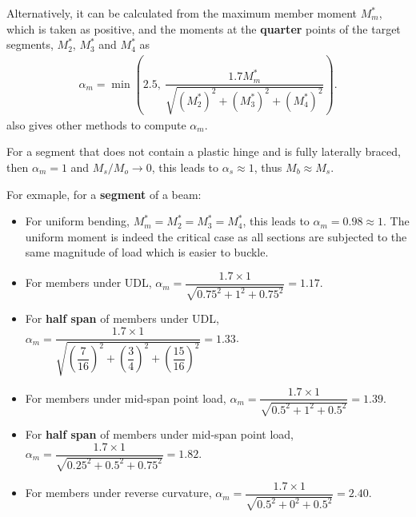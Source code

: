 Alternatively, it can be calculated from the maximum member moment $M^*_m$, which is taken as positive, and the moments at the \textbf{quarter} points of the target segments, $M^*_2$, $M^*_3$ and $M^*_4$ as
\begin{gather}
\alpha_m=\min\left(2.5,~\dfrac{1.7M^*_m}{\sqrt{\left(M^*_2\right)^2+\left(M^*_3\right)^2+\left(M^*_4\right)^2}}\right).
\end{gather}
 also gives other methods to compute $\alpha_m$.

For a segment that does not contain a plastic hinge and is fully laterally braced, then $\alpha_m=1$ and $M_s/M_o\rightarrow0$, this leads to $\alpha_s\approx1$, thus $M_b\approx{}M_s$.

For exmaple, for a \textbf{segment} of a beam:
\begin{itemize}
\item For uniform bending, $M^*_m=M^*_2=M^*_3=M^*_4$, this leads to $\alpha_m=0.98\approx1$. The uniform moment is indeed the critical case as all sections are subjected to the same magnitude of load which is easier to buckle.
\begin{figure}[H]
\centering
\end{figure}
\item For members under UDL, $\alpha_m=\dfrac{1.7\times1}{\sqrt{0.75^2+1^2+0.75^2}}=1.17$.
\begin{figure}[H]
\centering
\end{figure}
\item For \textbf{half span} of members under UDL, $\alpha_m=\dfrac{1.7\times1}{\sqrt{\left(\dfrac{7}{16}\right)^2+\left(\dfrac{3}{4}\right)^2+\left(\dfrac{15}{16}\right)^2}}=1.33$.
\begin{figure}[H]
\centering
\end{figure}
\item For members under mid-span point load, $\alpha_m=\dfrac{1.7\times1}{\sqrt{0.5^2+1^2+0.5^2}}=1.39$.
\begin{figure}[H]
\centering
\end{figure}
\item For \textbf{half span} of members under mid-span point load, $\alpha_m=\dfrac{1.7\times1}{\sqrt{0.25^2+0.5^2+0.75^2}}=1.82$.
\begin{figure}[H]
\centering
\end{figure}
\item For members under reverse curvature, $\alpha_m=\dfrac{1.7\times1}{\sqrt{0.5^2+0^2+0.5^2}}=2.40$.
\begin{figure}[H]
\centering
\end{figure}
\end{itemize}

